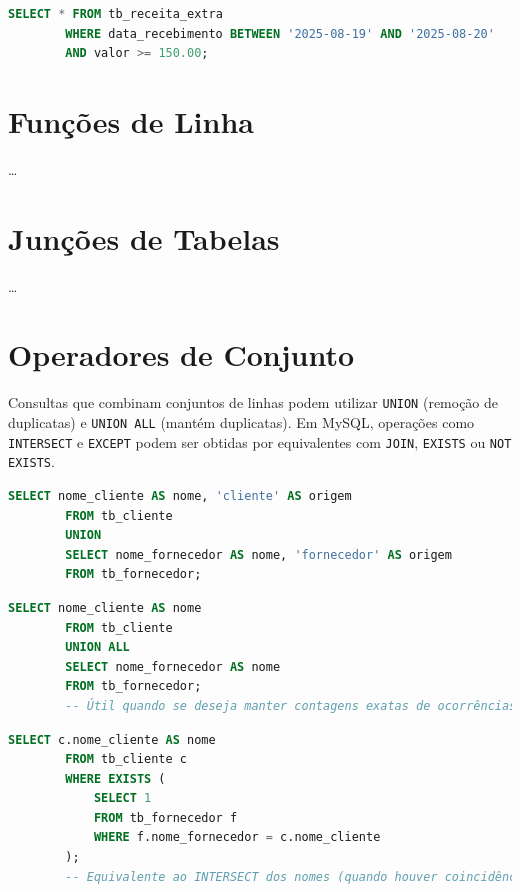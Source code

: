 \documentclass[
12pt,
a4paper,
semrecuonosumario,
sumario = abnt-6027-2012]{report}
\begin{document}
    \begin{lstlisting}[language=SQL,caption={SELECT -- Tabela \texttt{tb\_receita\_extra}}]
        SELECT * FROM tb_receita_extra
        WHERE data_recebimento BETWEEN '2025-08-19' AND '2025-08-20'
        AND valor >= 150.00;
    \end{lstlisting}

    \section{Funções de Linha}
    \dots

    \section{Junções de Tabelas}
    \dots

        \section{Operadores de Conjunto}

    Consultas que combinam conjuntos de linhas podem utilizar \texttt{UNION} (remoção de duplicatas) e \texttt{UNION ALL} (mantém duplicatas). Em MySQL, operações como \texttt{INTERSECT} e \texttt{EXCEPT} podem ser obtidas por equivalentes com \texttt{JOIN}, \texttt{EXISTS} ou \texttt{NOT EXISTS}.

    \begin{lstlisting}[language=SQL,caption={SELECT -- UNION: nomes de clientes e fornecedores sem duplicatas}]
        SELECT nome_cliente AS nome, 'cliente' AS origem
        FROM tb_cliente
        UNION
        SELECT nome_fornecedor AS nome, 'fornecedor' AS origem
        FROM tb_fornecedor;
    \end{lstlisting}

    \begin{lstlisting}[language=SQL,caption={SELECT -- UNION ALL: contabiliza todas as ocorrências (com duplicatas)}]
        SELECT nome_cliente AS nome
        FROM tb_cliente
        UNION ALL
        SELECT nome_fornecedor AS nome
        FROM tb_fornecedor;
        -- Útil quando se deseja manter contagens exatas de ocorrências
    \end{lstlisting}

    \begin{lstlisting}[language=SQL,caption={SELECT -- INTERSECT (equivalente): nomes presentes em cliente e fornecedor}]
        SELECT c.nome_cliente AS nome
        FROM tb_cliente c
        WHERE EXISTS (
            SELECT 1
            FROM tb_fornecedor f
            WHERE f.nome_fornecedor = c.nome_cliente
        );
        -- Equivalente ao INTERSECT dos nomes (quando houver coincidência literal)
    \end{lstlisting}
\end{document}
